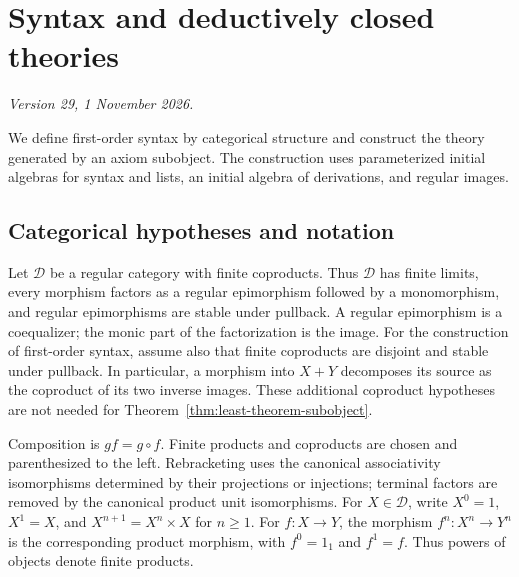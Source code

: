 \documentclass[11pt]{article}
\theoremstyle{definition}\newtheorem{definition}[theorem]{Definition}
\begin{document}
\appendix
\section{Syntax and deductively closed theories}
\label{app:syntax-theories}
\noindent\textit{Version 29, 1 November 2026.}\par\medskip

We define first-order syntax by categorical structure and construct
the theory generated by an axiom subobject. The construction uses
parameterized initial algebras for syntax and lists, an initial algebra
of derivations, and regular images.

\subsection{Categorical hypotheses and notation}
\label{app:categorical-hypotheses}

Let $\mathcal D$ be a regular category with finite coproducts.
Thus $\mathcal D$ has finite limits, every morphism factors as a
regular epimorphism followed by a monomorphism, and regular
epimorphisms are stable under pullback. A regular epimorphism is a
coequalizer; the monic part of the factorization is the image.
For the construction of first-order syntax, assume also that finite
coproducts are disjoint and stable under pullback. In particular,
a morphism into $X+Y$ decomposes its source as the coproduct of its
two inverse images. These additional coproduct hypotheses are not
needed for Theorem~\ref{thm:least-theorem-subobject}.

Composition is $gf=g\circ f$. Finite products and coproducts are
chosen and parenthesized to the left. Rebracketing uses the canonical
associativity isomorphisms determined by their projections or injections;
terminal factors are removed by the canonical product unit isomorphisms.
For $X\in\mathcal D$, write $X^0=1$, $X^1=X$, and
$X^{n+1}=X^n\times X$ for $n\geq1$.
For $f:X\to Y$, the morphism $f^n:X^n\to Y^n$ is the corresponding
product morphism, with $f^0=1_1$ and $f^1=f$.
Thus powers of objects denote finite products.
\end{document}
